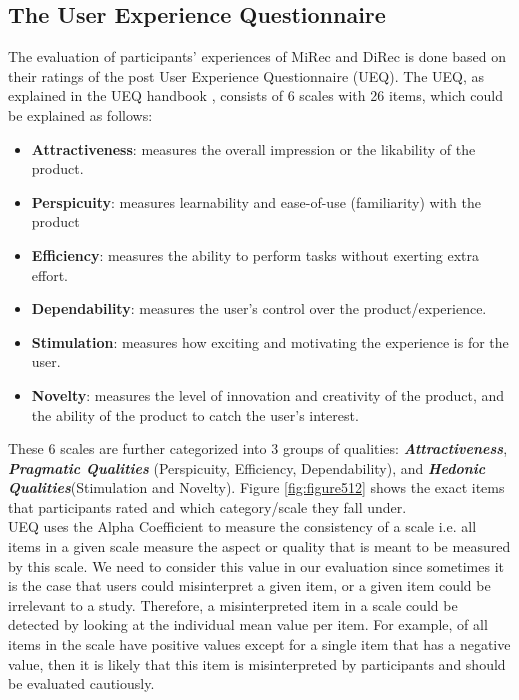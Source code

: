 \subsection{The User Experience Questionnaire}
The evaluation of participants' experiences of MiRec and DiRec is done based
on their ratings of the post User Experience Questionnaire (UEQ). The UEQ, as
explained in the UEQ handbook \cite{UEQHandbook}, consists of 6 scales with 26
items, which could be explained as follows:
\begin{itemize}
  \item \textbf{Attractiveness}: measures the overall impression or the
  likability of the product.
  \item \textbf{Perspicuity}: measures learnability and ease-of-use
  (familiarity) with the product
  \item \textbf{Efficiency}: measures the ability to perform tasks without
  exerting extra effort.
  \item \textbf{Dependability}: measures the user's control over the
  product/experience.
  \item \textbf{Stimulation}: measures how exciting and motivating the
  experience is for the user.
  \item \textbf{Novelty}: measures the level of innovation and creativity of the
  product, and the ability of the product to catch the user's interest.
\end{itemize}
These 6 scales are further categorized into 3 groups of qualities:
\textbf{\textit{Attractiveness}}, \textbf{\textit{Pragmatic
Qualities}} (Perspicuity, Efficiency, Dependability), and
\textbf{\textit{Hedonic Qualities}}(Stimulation and Novelty). Figure
\ref{fig:figure512} shows the exact items that participants rated and which
category/scale they fall under.\\
UEQ uses the Alpha Coefficient to measure the consistency of a scale i.e.
all items in a given scale  measure the aspect or quality that is meant to be
measured by this scale.
We need to consider this value in our evaluation since sometimes it is the case
that users could misinterpret a given item, or a given item could be irrelevant
to a study. Therefore, a misinterpreted item in a scale could be detected by
looking at the individual mean value per item. For example, of all items in the
scale have positive values except for a single item that has a negative value,
then it is likely that this item is misinterpreted by participants and should be
evaluated cautiously.\\
